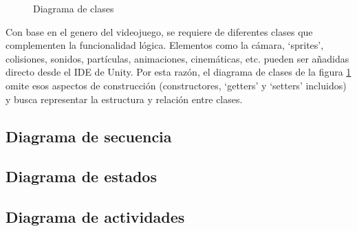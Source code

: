 \documentclass[12pt,twoside]{article}
\begin{document}
	\begin{figure}[H]
		\centering
		\caption{Diagrama de clases}
		\label{diagrama: clases}
	\end{figure}

	Con base en el genero del videojuego, se requiere de diferentes clases que complementen la funcionalidad lógica. Elementos como la cámara, `sprites', colisiones, sonidos, partículas, animaciones, cinemáticas, etc. pueden ser añadidas directo desde el IDE de Unity. Por esta razón, el diagrama de clases de la figura \ref{diagrama: clases} omite esos aspectos de construcción (constructores, `getters' y `setters' incluidos) y busca representar la estructura y relación entre clases.

	
	\clearpage
	\subsection{Diagrama de secuencia}

	\subsection{Diagrama de estados}

	\subsection{Diagrama de actividades}
\end{document}
